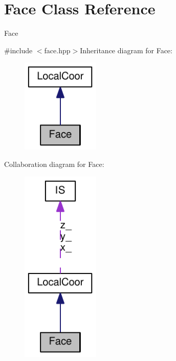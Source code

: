 \hypertarget{classFace}{
\section{Face Class Reference}
\label{classFace}
}


Face  


{\ttfamily \#include $<$face.hpp$>$}Inheritance diagram for Face:\nopagebreak
\begin{figure}[H]
\begin{center}
\leavevmode
\includegraphics[width=105pt]{classFace__inherit__graph}
\end{center}
\end{figure}
Collaboration diagram for Face:\nopagebreak
\begin{figure}[H]
\begin{center}
\leavevmode
\includegraphics[width=105pt]{classFace__coll__graph}
\end{center}
\end{figure}
